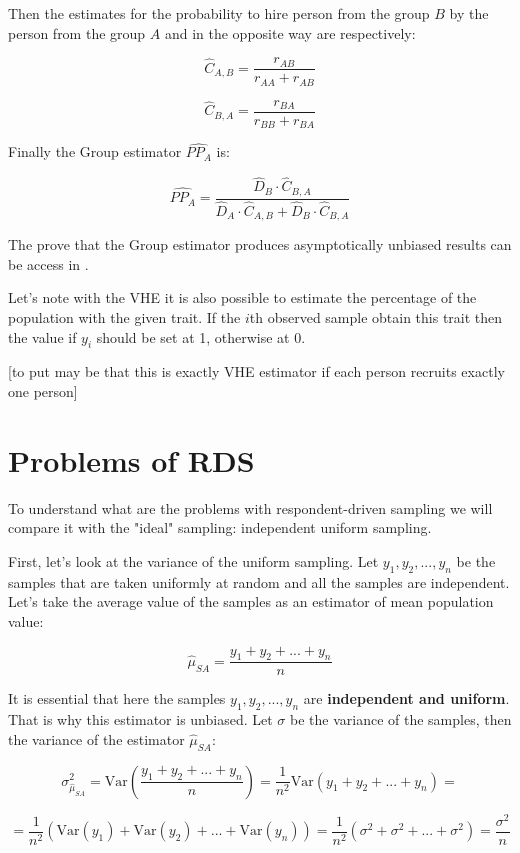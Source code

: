\documentclass[12pt]{report}
\begin{document}
Then the estimates for the probability to hire person from the group $B$ by the person from the group $A$ and in the opposite way are respectively:


$$ \widehat{C}_{A, B} = \frac{r_{AB}}{r_{AA} + r_{AB}} $$

$$ \widehat{C}_{B, A} = \frac{r_{BA}}{r_{BB} + r_{BA}} $$

Finally the Group estimator $\widehat{PP_A}$ is:

$$ \widehat{PP_A} = \frac{ \widehat{D}_B \cdot \widehat{C}_{B, A}}{ 
\widehat{D}_A \cdot \widehat{C}_{A, B} + \widehat{D}_B \cdot \widehat{C}_{B, A}} $$

The prove that the Group estimator produces asymptotically unbiased results can be access in \cite{salganik2004sampling}.

Let's note with the VHE it is also possible to estimate the percentage of the population with the given trait. If the $i$th observed sample obtain this trait then the value if $y_i$ should be set at 1, otherwise at 0.

[to put may be that this is exactly VHE estimator if each person recruits exactly one person]

\section{Problems of RDS}

To understand what are the problems with respondent-driven sampling we will compare it with the "ideal" sampling: independent uniform sampling.

First, let's look at the variance of the uniform sampling.
Let $y_1, y_2, ..., y_n$ be the samples that are taken uniformly at random and all the samples are independent. Let's take the average value of the samples as an estimator of mean population value:

$$ \widehat{\mu}_{SA} = \frac{y_1 + y_2 + ... + y_n}{n}$$

It is essential that here the samples $y_1, y_2, ..., y_n$ are \textbf{independent and uniform}. That is why this estimator is unbiased. 
Let $\sigma$ be the variance of the samples, then the variance of the estimator $ \widehat{\mu}_{SA}$:

$$ \sigma^2_{\hat{\mu}_{SA}} = \mathrm{Var}\left( \frac{y_1 + y_2 + ... + y_n}{n}\right)=\frac{1}{n^2} \mathrm{Var}(y_1 + y_2 + ... + y_n) =$$

$$= \frac{1}{n^2} \left(\mathrm{Var}(y_1) + \mathrm{Var}(y_2) + ... + \mathrm{Var}(y_n)\right)=\frac{1}{n^2} \left(\sigma^2 + \sigma^2 + ... + \sigma^2\right) = \frac{\sigma^2}{n}$$
\end{document}
